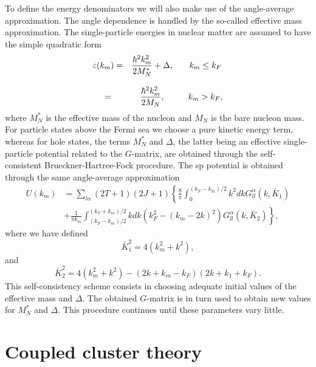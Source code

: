 To define the energy denominators we will also make use of the
angle-average approximation.
The angle dependence is handled by the
so-called effective mass approximation. The single-particle energies
in nuclear matter are assumed to have the simple quadratic form
\begin{equation}
   \begin{array}{ccc}
   \varepsilon (k_m)=&
   {\displaystyle\frac{\hbar^{2}k_m^2}
   {2M_{N}^{*}}}+\Delta ,&\hspace{3mm}k_m\leq k_F\\
   &&\\
   =&{\displaystyle\frac{\hbar^{2}
   k_m^2}{2M_{N}}},&\hspace{3mm}k_m> k_F ,\\
   \end{array}
   \label{eq:spen}
\end{equation}
where $M_{N}^{*}$ is the effective mass of the nucleon and $M_{N}$ is the
bare nucleon mass. For particle states above the Fermi sea we choose
a pure kinetic energy term, whereas for hole states,
the terms $M_{N}^{*}$ and $\Delta$, the latter being 
an effective single-particle
potential related to the $G$-matrix, are obtained through the
self-consistent Brueckner-Hartree-Fock procedure.
The sp potential is obtained through the same angle-average approximation
\begin{align}
  \label{eq:Uav}
   U(k_m) & =\sum_{l\alpha} (2T+1)(2J+1)
   \left \{ \frac{8}{\pi}\int_{0}^{(k_F-k_m)/2}
   k^2dk G_{ll}^{\alpha}(k,\bar{K}_1) \right.  \\
   &    \left.
    + \frac{1}{\pi k_m}\int_{(k_F-k_m)/2}^{(k_F+k_m)/2}
   kdk (k_F ^2-(k_m-2k)^2)
   G_{ll}^{\alpha}(k,\bar{K}_2)  \right \}  \nonumber,
\end{align}
where we have defined
\begin{equation}
    \bar{K}_1^2=4(k_m^2+k^2),
\end{equation}
and
\begin{equation}
    \bar{K}_2^2=4(k_m^2+k^2)-(2k+k_m-k_F)(2k+k_1+k_F).
\end{equation}
This
self-consistency scheme consists in choosing adequate initial values of the
effective mass and $\Delta$. The obtained $G$-matrix is in turn used to
obtain new values for $M_{N}^{*}$ and $\Delta$. This procedure
continues until these parameters vary little.


\section{Coupled cluster theory}
